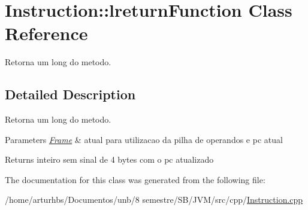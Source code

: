 \hypertarget{classInstruction_1_1lreturnFunction}{}\section{Instruction\+:\+:lreturn\+Function Class Reference}
\label{classInstruction_1_1lreturnFunction}


Retorna um long do metodo.  




\subsection{Detailed Description}
Retorna um long do metodo. 


\begin{DoxyParams}{Parameters}
{\em \hyperlink{classFrame}{Frame}} & atual para utilizacao da pilha de operandos e pc atual \\
\hline
\end{DoxyParams}
\begin{DoxyReturn}{Returns}
inteiro sem sinal de 4 bytes com o pc atualizado 
\end{DoxyReturn}


The documentation for this class was generated from the following file\+:\begin{DoxyCompactItemize}
\item 
/home/arturhbs/\+Documentos/unb/8 semestre/\+S\+B/\+J\+V\+M/src/cpp/\hyperlink{Instruction_8cpp}{Instruction.\+cpp}\end{DoxyCompactItemize}
